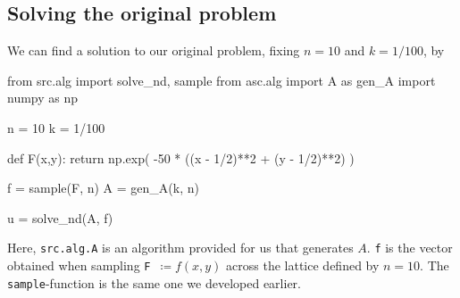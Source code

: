 \documentclass[12pt]{article}
\begin{document}
\begin{multicols}{2}
    \subsection*{Solving the original problem}

    We can find a solution to our original problem,
    fixing $n = 10$ and $k = 1/100$, by
    \begin{python}
from src.alg import solve_nd, sample
from asc.alg import A as gen_A
import numpy as np

n = 10
k = 1/100

def F(x,y):
    return np.exp(
        -50 * ((x - 1/2)**2 + (y - 1/2)**2)
    )

f = sample(F, n)
A = gen_A(k, n)

u = solve_nd(A, f)
    \end{python}
    Here, {\tt src.alg.A} is an algorithm provided for us that generates $A$.
    {\tt f} is the vector obtained when sampling
    \mbox{{\tt F} $\coloneqq f(x, y)$} across the lattice defined by $n = 10$.
    The {\tt sample}-function is the same one we developed earlier.
\end{multicols}
\end{document}
